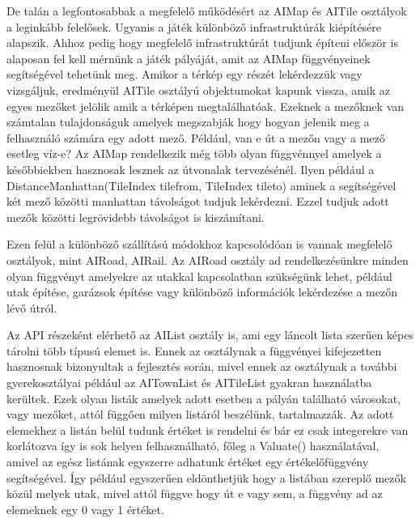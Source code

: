 De talán a legfontosabbak a megfelelő működésért az AIMap és AITile osztályok a leginkább felelősek. Ugyanis a játék különböző infrastruktúrák kiépítésére alapszik. Ahhoz pedig hogy megfelelő infrastruktúrát tudjunk építeni először is alaposan fel kell mérnünk a játék pályáját, amit az AIMap függvényeinek segítségével tehetünk meg. Amikor a térkép egy részét lekérdezzük vagy vizsgáljuk, eredményül AITile osztályú objektumokat kapunk vissza, amik az egyes mezőket jelölik amik a térképen megtalálhatóak. Ezeknek a mezőknek van számtalan tulajdonságuk amelyek megszabják hogy hogyan jelenik meg a felhasználó számára egy adott mező. Például, van e út a mezőn vagy a mező esetleg víz-e? Az AIMap rendelkezik még több olyan függvénnyel amelyek a későbbiekben hasznosak lesznek az útvonalak tervezésénél. Ilyen például a DistanceManhattan(TileIndex tilefrom, TileIndex tileto) aminek a segítségével két mező közötti manhattan távolságot tudjuk lekérdezni. Ezzel tudjuk adott mezők közötti legrövidebb távolságot is kiszámítani.

Ezen felül a különböző szállítású módokhoz kapcsolódóan is vannak megfelelő osztályok, mint AIRoad, AIRail. Az AIRoad osztály ad rendelkezésünkre minden olyan függvényt amelyekre az utakkal kapcsolatban szükségünk lehet, például utak építése, garázsok építése vagy különböző információk lekérdezése a mezőn lévő útról.

Az API részeként elérhető az AIList osztály is, ami egy láncolt lista szerűen képes tárolni több típusú elemet is. Ennek az osztálynak a függvényei kifejezetten hasznosnak bizonyultak a fejlesztés során, mivel ennek az osztálynak a további gyerekosztályai például az AITownList és AITileList gyakran használatba kerültek. Ezek olyan listák amelyek adott esetben a pályán található városokat, vagy mezőket, attól függően milyen listáról beszélünk, tartalmazzák. Az adott elemekhez a listán belül tudunk értéket is rendelni és bár ez csak integerekre van korlátozva így is sok helyen felhasználható, főleg a Valuate() használatával, amivel az egész listának egyszerre adhatunk értéket egy értékelőfüggvény segítségével. Így például egyszerűen eldönthetjük hogy a listában szereplő mezők közül melyek utak, mivel attól függve hogy út e vagy sem, a függvény ad az elemeknek egy 0 vagy 1 értéket.


